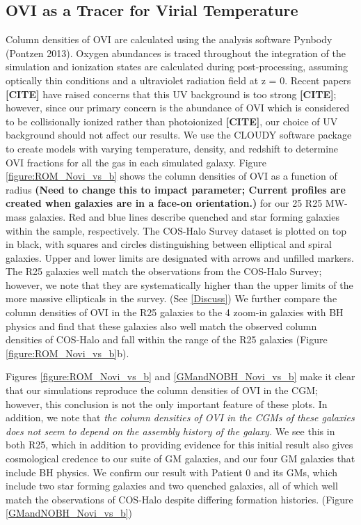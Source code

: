 \documentclass[]{emulateapj}
\begin{document}
\subsection{OVI as a Tracer for Virial Temperature}
\label{Result:OVIasTtracer}
Column densities of OVI are calculated using the analysis software Pynbody (Pontzen 2013). Oxygen abundances is traced throughout the integration of the simulation and  ionization states are calculated during post-processing, assuming optically thin conditions and a \cite{Haardt2012} ultraviolet radiation field at z = 0. Recent papers \textbf{[CITE]} have raised concerns that this UV background is too strong \textbf{[CITE]}; however, since our primary concern is the abundance of OVI which is considered to be collisionally ionized rather than photoionized \textbf{[CITE]}, our choice of UV background should not affect our results. We use the CLOUDY software package \citep{Ferland1998,Stinson2012} to create models with varying temperature, density, and redshift to determine OVI fractions for all the gas in each simulated galaxy. Figure \ref{figure:ROM_Novi_vs_b} shows the column densities of OVI as a function of radius \textbf{(Need to change this to impact parameter; Current profiles are created when galaxies are in a face-on orientation.)} for our 25 R25 MW-mass galaxies. Red and blue lines describe quenched and star forming galaxies within the sample, respectively. The COS-Halo Survey dataset is plotted on top in black, with squares and circles distinguishing between elliptical and spiral galaxies. Upper and lower limits are designated with arrows and unfilled markers. The R25 galaxies well match the observations from the COS-Halo Survey; however, we note that they are systematically higher than the upper limits of the more massive ellipticals in the survey. (See \ref{Discuss}) We further compare the column densities of OVI in the R25 galaxies to the 4 zoom-in galaxies with BH physics and find that these galaxies also well match the observed column densities of COS-Halo and fall within the range of the R25 galaxies (Figure \ref{figure:ROM_Novi_vs_b}b). 

Figures \ref{figure:ROM_Novi_vs_b} and \ref{GMandNOBH_Novi_vs_b} make it clear that our simulations reproduce the column densities of OVI in the CGM; however, this conclusion is not the only important feature of these plots. In addition, we note that \textit{the column densities of OVI in the CGMs of these galaxies does not seem to depend on the assembly history of the galaxy.} We see this in both R25, which in addition to providing evidence for this initial result also gives cosmological credence to our suite of GM galaxies, and our four GM galaxies that include BH physics. We confirm our result with Patient 0 and its GMs, which include two star forming galaxies and two quenched galaxies, all of which well match the observations of COS-Halo despite differing formation histories. (Figure \ref{GMandNOBH_Novi_vs_b})
\end{document}
